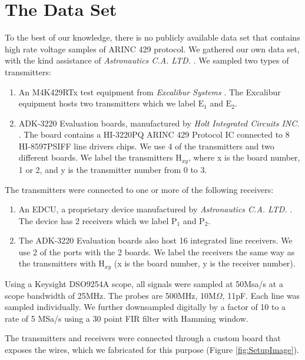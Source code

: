 \documentclass[english]{llncs}
\newcommand{\level}[1]{\section{#1}}
\newcommand{\level}[1]{\chapter{#1}}
\begin{document}
 \vspace*{-2ex} %
\level{The Data Set} \label{TheDataSet}
  To the best of our knowledge, there is no publicly available data set that contains high rate voltage samples of ARINC 429 protocol. We gathered our own data set, with the kind assistance of \textit{Astronautics C.A. LTD.} \cite{astronautics2019home}.   We sampled two types of transmitters:
  \begin{enumerate}
   \vspace*{-1ex} %
     \item An M4K429RTx test equipment from \textit{Excalibur Systems} \cite{excalibur2019m4k429rtx}. The Excalibur equipment hosts two transmitters which we label \(\text{E}_1\) and \(\text{E}_2\).
     \item ADK-3220 Evaluation boards, manufactured by \textit{Holt Integrated Circuits INC.} \cite{holt2019evaluation}. The board contains a HI-3220PQ ARINC 429 Protocol IC connected to 8 HI-8597PSIFF line drivers chips. We use 4 of the transmitters and two different boards. We label the transmitters \(\text{H}_{xy}\), where x is the board number, 1 or 2, and y is the transmitter number from 0 to 3.
  \end{enumerate}
  
  \noindent The transmitters were connected to one or more of the following receivers:
  \begin{enumerate}
   \vspace*{-1ex} %
    \item An EDCU, a proprietary device manufactured by \textit{Astronautics C.A. LTD.} \cite{astronautics2019edcu}. The device has 2 receivers which we label \(\text{P}_1\) and \(\text{P}_2\).
    \item The ADK-3220 Evaluation boards also host 16 integrated line receivers. We use 2 of the ports with the 2 boards. We label the receivers the same way as the transmitters with \(\text{H}_{xy}\) (x is the board number, y is the receiver number).
  \end{enumerate}
  
  Using a Keysight DSO9254A scope, all signals were sampled at 50Msa/s at a scope bandwidth of 25MHz. The probes are 500MHz, 10M\(\Omega\), 11pF. Each line was sampled individually. We further downsampled digitally by a factor of 10 to a rate of 5 MSa/s using a 30 point FIR filter with Hamming window.
  
  The transmitters and receivers were connected through a custom board that exposes the wires, which we fabricated for this purpose (Figure \ref{fig:SetupImage}).
  
\end{document}
